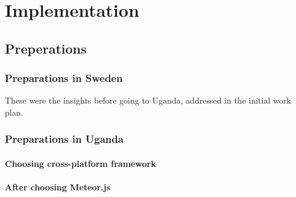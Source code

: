 \chapter{Implementation}\label{cha:implementation}

\section{Preperations}

\subsection{Preparations in Sweden}

These were the insights before going to Uganda, addressed in the initial work plan.

\subsection{Preparations in Uganda}

\subsubsection{Choosing cross-platform framework}

\subsubsection{After choosing Meteor.js}








